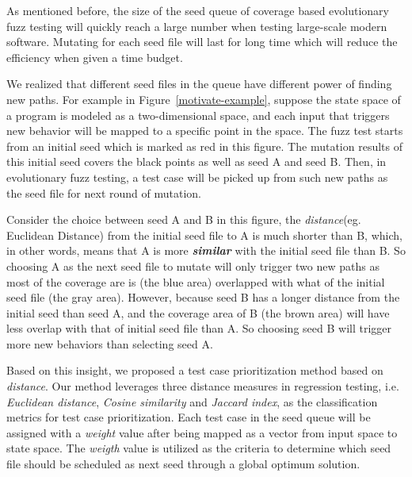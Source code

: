 
As mentioned before, the size of the seed queue of coverage based evolutionary fuzz testing will quickly reach a large number when testing large-scale modern software. Mutating for each seed file will last for long time which will reduce the efficiency when given a time budget. 

We realized that different seed files in the queue have different power of finding new paths. For example in Figure~\ref{motivate-example}, suppose the state space of a program is modeled as a two-dimensional space, and each input that triggers new behavior will be mapped to a specific point in the space. The fuzz test starts from an initial seed which is marked as red in this figure. The mutation results of this initial seed covers the black points as well as seed A and seed B. Then, in evolutionary fuzz testing, a test case will be picked up from such new paths as the seed file for next round of mutation. 

Consider the choice between seed A and B in this figure, the \emph{distance}(eg. Euclidean Distance) from the initial seed file to A is much shorter than B, which, in other words, means that A is more \textbf{\textit{similar}} with the initial seed file than B. So choosing A as the next seed file to mutate will only trigger two new paths as most of the coverage are is (the blue area) overlapped with what of the initial seed file (the gray area). However, because seed B has a longer distance from the initial seed than seed A, and the coverage area of B (the brown area) will have less overlap with that of initial seed file than A. So choosing seed B will trigger more new behaviors than selecting seed A.


Based on this insight, we proposed a test case prioritization method based on \emph{distance}. Our method leverages three distance measures in regression testing, i.e. \textit{Euclidean distance}, \textit{Cosine similarity} and \textit{Jaccard index}, as the classification metrics for test case prioritization. Each test case in the seed queue will be assigned with a \emph{weight} value after being mapped as a vector from input space to state space. The \emph{weigth} value is utilized as the criteria to determine which seed file should be scheduled as next seed through a global optimum solution.

